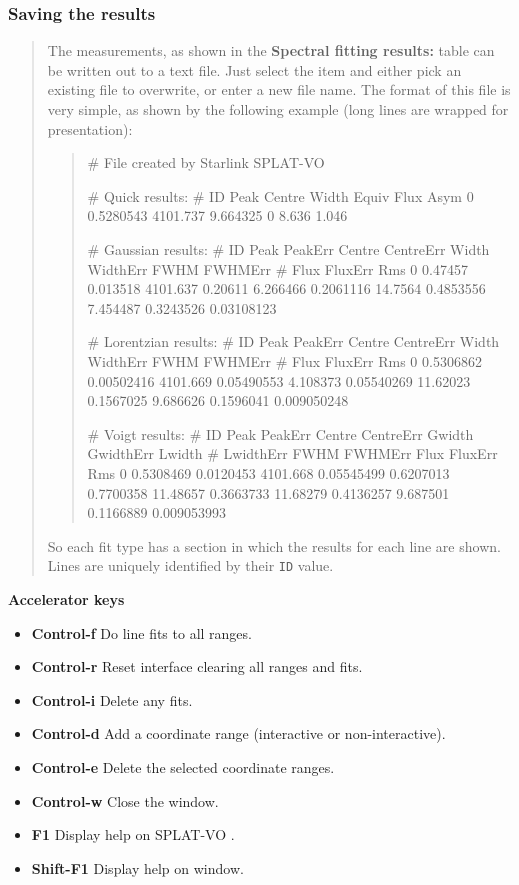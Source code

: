 \documentclass[twoside,11pt,nolof]{starlink}
\providecommand{\SPLAT}{\textsf{SPLAT-VO }}
\newcommand{\submenuitem}[2]{\latexhtml{\textbf{#1$\rightarrow$#2}}{\textbf{#1->#2}}}
\newcommand{\labelitem}[1]{\textbf{#1}}
\providecommand{\hitext}[1]{\texttt{#1}}
\providecommand{\subheading}[1]{\textbf{\large{#1}}}
\begin{document}
\subsubsection{Saving the results}
\begin{quote}
 The measurements, as shown in the \labelitem{Spectral fitting
 results:} table can be written out to a text file. Just select the
 \submenuitem{File}{Save line fits} item and either pick an existing file
 to overwrite, or enter a new file name. The format of this file is
 very simple, as shown by the following example (long lines are wrapped
 for presentation):
 \begin{quote}
  \begin{terminalv}

# File created by Starlink SPLAT-VO

# Quick results:
# ID Peak Centre Width Equiv Flux Asym
0 0.5280543 4101.737 9.664325 0 8.636 1.046

# Gaussian results:
# ID Peak PeakErr Centre CentreErr Width WidthErr FWHM FWHMErr
# Flux FluxErr Rms
0 0.47457 0.013518 4101.637 0.20611 6.266466 0.2061116 14.7564 0.4853556
7.454487 0.3243526 0.03108123

# Lorentzian results:
# ID Peak PeakErr Centre CentreErr Width WidthErr FWHM FWHMErr
# Flux FluxErr Rms
0 0.5306862 0.00502416 4101.669 0.05490553 4.108373 0.05540269 11.62023 0.1567025
9.686626 0.1596041 0.009050248

# Voigt results:
# ID Peak PeakErr Centre CentreErr Gwidth GwidthErr Lwidth
# LwidthErr FWHM FWHMErr Flux FluxErr Rms
0 0.5308469 0.0120453 4101.668 0.05545499 0.6207013 0.7700358 11.48657 0.3663733
11.68279 0.4136257 9.687501 0.1166889 0.009053993

  \end{terminalv}
 \end{quote}
 So each fit type has a section in which the results for each line are
 shown. Lines are uniquely identified by their \hitext{ID} value.
\end{quote}

\subheading{Accelerator keys}

\begin{itemize}
\item \labelitem{Control-f} Do line fits to all ranges.
\item \labelitem{Control-r} Reset interface clearing all ranges and fits.
\item \labelitem{Control-i} Delete any fits.

\item \labelitem{Control-d} Add a coordinate range (interactive or non-interactive).
\item \labelitem{Control-e} Delete the selected coordinate ranges.

\item \labelitem{Control-w} Close the window.
\item \labelitem{F1} Display help on \SPLAT.
\item \labelitem{Shift-F1} Display help on window.
\end{itemize}
\end{document}
